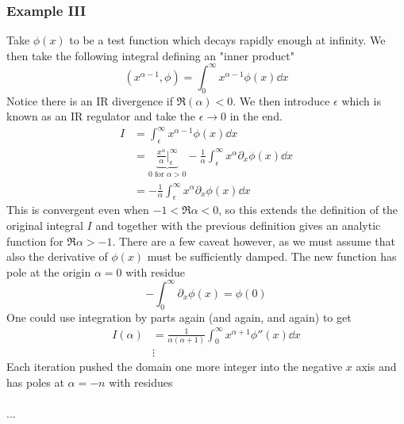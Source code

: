 \documentclass[a4paper,12pt]{article}
\begin{document}
\subsubsection{Example III}
Take $\phi(x)$ to be a test function which decays rapidly enough at infinity. We then take the following integral defining an "inner product"
\begin{equation}
(x^{\alpha-1},\phi)=\int_0^\infty x^{\alpha-1}\phi(x)\dd x
\end{equation}
Notice there is an IR divergence if $\Re(\alpha)<0$. We then introduce $\epsilon$ which is known as an IR regulator and take the $\epsilon\to 0$ in the end.
\begin{equation}
\begin{aligned}
I&=\int_\epsilon^\infty x^{\alpha-1}\phi(x)\dd x\\
&=\underbrace{\frac{x^\alpha}{\alpha}\big|^{\infty}_\epsilon}_{0 \text{ for } \alpha > 0}
-\frac{1}{\alpha}\int_\epsilon^\infty x^{\alpha}\partial_x\phi(x)\dd x\\
&=-\frac{1}{\alpha}\int_\epsilon^\infty x^{\alpha}\partial_x\phi(x)\dd x
\end{aligned}
\end{equation}
This is convergent even when $-1<\Re \alpha  <0$, so this extends the definition of the original integral $I$ and together with the previous definition gives an analytic function for $\Re \alpha >-1$. There are a few caveat however, as we must assume that also the derivative of $\phi(x)$ must be sufficiently damped. The new function has pole at the origin $\alpha=0$ with residue
\begin{equation}
-\int_0^\infty \partial_x\phi(x)=\phi(0)
\end{equation}
One could use integration by parts again (and again, and again) to get
\begin{equation}
\begin{aligned}
I(\alpha)&=\frac{1}{\alpha(\alpha+1)}\int_{0}^{\infty}x^{\alpha+1}\phi''(x)\dd x
\\
&\vdots
\end{aligned}
\end{equation}
Each iteration pushed the domain one more integer into the negative $x$ axis and has poles at $\alpha=-n$ with residues \\\\
...\\\\
\end{document}
